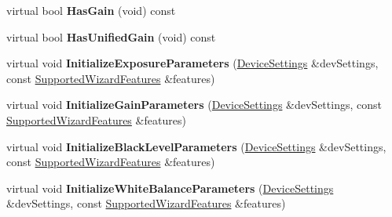 \begin{DoxyCompactItemize}
\item 
\hypertarget{class_wizard_quick_setup_gen_i_cam_a1f7f77f769c7a6e9b4101c046641acfa}{virtual bool {\bfseries Has\+Gain} (void) const }\label{class_wizard_quick_setup_gen_i_cam_a1f7f77f769c7a6e9b4101c046641acfa}

\item 
\hypertarget{class_wizard_quick_setup_gen_i_cam_ab629d23b1f53b3e95a99efc73b6955a2}{virtual bool {\bfseries Has\+Unified\+Gain} (void) const }\label{class_wizard_quick_setup_gen_i_cam_ab629d23b1f53b3e95a99efc73b6955a2}

\item 
\hypertarget{class_wizard_quick_setup_gen_i_cam_ab12fee718ec3dab170bee1933c98a829}{virtual void {\bfseries Initialize\+Exposure\+Parameters} (\hyperlink{struct_wizard_quick_setup_1_1_device_settings}{Device\+Settings} \&dev\+Settings, const \hyperlink{struct_wizard_quick_setup_1_1_supported_wizard_features}{Supported\+Wizard\+Features} \&features)}\label{class_wizard_quick_setup_gen_i_cam_ab12fee718ec3dab170bee1933c98a829}

\item 
\hypertarget{class_wizard_quick_setup_gen_i_cam_a2a0ad03280a6146bd158db3b4d81e455}{virtual void {\bfseries Initialize\+Gain\+Parameters} (\hyperlink{struct_wizard_quick_setup_1_1_device_settings}{Device\+Settings} \&dev\+Settings, const \hyperlink{struct_wizard_quick_setup_1_1_supported_wizard_features}{Supported\+Wizard\+Features} \&features)}\label{class_wizard_quick_setup_gen_i_cam_a2a0ad03280a6146bd158db3b4d81e455}

\item 
\hypertarget{class_wizard_quick_setup_gen_i_cam_a44144449e5b7c9566cb9872aa3415ffd}{virtual void {\bfseries Initialize\+Black\+Level\+Parameters} (\hyperlink{struct_wizard_quick_setup_1_1_device_settings}{Device\+Settings} \&dev\+Settings, const \hyperlink{struct_wizard_quick_setup_1_1_supported_wizard_features}{Supported\+Wizard\+Features} \&features)}\label{class_wizard_quick_setup_gen_i_cam_a44144449e5b7c9566cb9872aa3415ffd}

\item 
\hypertarget{class_wizard_quick_setup_gen_i_cam_a5697a81d5c6b1f2f173fac7a7dfeffe0}{virtual void {\bfseries Initialize\+White\+Balance\+Parameters} (\hyperlink{struct_wizard_quick_setup_1_1_device_settings}{Device\+Settings} \&dev\+Settings, const \hyperlink{struct_wizard_quick_setup_1_1_supported_wizard_features}{Supported\+Wizard\+Features} \&features)}\label{class_wizard_quick_setup_gen_i_cam_a5697a81d5c6b1f2f173fac7a7dfeffe0}


\end{DoxyCompactItemize}
